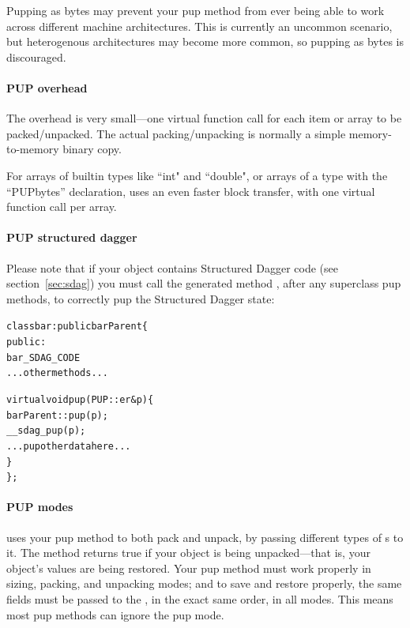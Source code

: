 Pupping as bytes may prevent your pup method from ever being able to
work across different machine architectures.  This is currently
an uncommon scenario, but heterogenous architectures may become more
common, so pupping as bytes is discouraged.

\paragraph{PUP overhead}

\label{sec:pupoverhead}

The  overhead is very small---one virtual function call
for each item or array to be packed/unpacked.  The actual packing/unpacking is
normally a simple memory-to-memory binary copy. 

For arrays of builtin types like ``int" and ``double", or arrays of a type 
with the ``PUPbytes'' declaration,  uses an even faster block 
transfer, with one virtual function call per array.


\paragraph{PUP structured dagger}

\label{sec:pupsdag}

Please note that if your object contains Structured Dagger code (see section~\ref{sec:sdag}) you must call the generated method , after any superclass pup methods, to correctly pup the Structured Dagger state:

\begin{alltt}
class bar : public barParent \{
 public:
    bar_SDAG_CODE 
    ...other methods...

    virtual void pup(PUP::er& p) \{
      barParent::pup(p);
      __sdag_pup(p);
      ...pup other data here...
    \}
\};
\end{alltt}



\paragraph{PUP modes}

\label{sec:pupmodes}

\charmpp{} uses your pup method to both pack and unpack, 
by passing different types of s to it.  The method
 returns true if your object is being unpacked---that 
is, your object's values are being restored.  Your pup method must
work properly in sizing, packing, and unpacking modes; and
to save and restore properly, the same fields must be passed 
to the , in the exact same order, in all modes.
This means most pup methods can ignore the pup mode.

